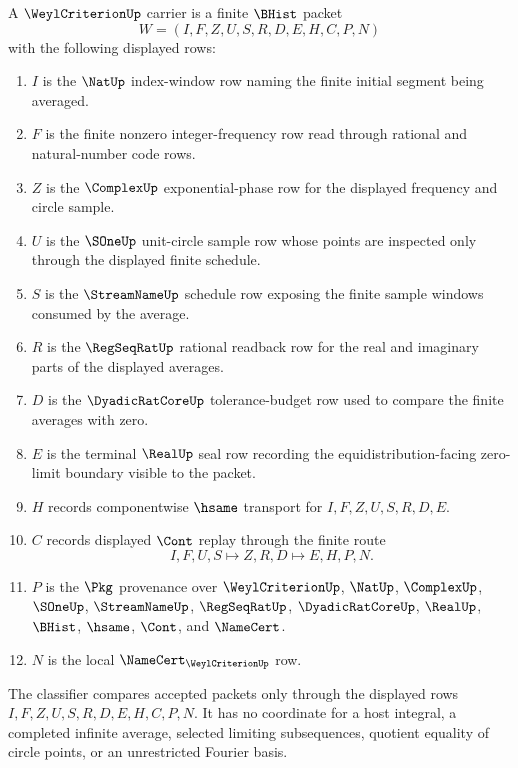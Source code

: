 \begin{definition}
\label{def:weyl-criterion-carrier}
A $\WeylCriterionUp$ carrier is a finite $\BHist$ packet
$$
W=(I,F,Z,U,S,R,D,E,H,C,P,N)
$$
with the following displayed rows:
\begin{enumerate}
\item $I$ is the $\NatUp$ index-window row naming the finite initial segment being averaged.
\item $F$ is the finite nonzero integer-frequency row read through rational and natural-number code rows.
\item $Z$ is the $\ComplexUp$ exponential-phase row for the displayed frequency and circle sample.
\item $U$ is the $\SOneUp$ unit-circle sample row whose points are inspected only through the displayed finite schedule.
\item $S$ is the $\StreamNameUp$ schedule row exposing the finite sample windows consumed by the average.
\item $R$ is the $\RegSeqRatUp$ rational readback row for the real and imaginary parts of the displayed averages.
\item $D$ is the $\DyadicRatCoreUp$ tolerance-budget row used to compare the finite averages with zero.
\item $E$ is the terminal $\RealUp$ seal row recording the equidistribution-facing zero-limit boundary visible to the packet.
\item $H$ records componentwise $\hsame$ transport for $I,F,Z,U,S,R,D,E$.
\item $C$ records displayed $\Cont$ replay through the finite route
$$
I,F,U,S \longmapsto Z,R,D \longmapsto E,H,P,N .
$$
\item $P$ is the $\Pkg$ provenance over $\WeylCriterionUp$, $\NatUp$, $\ComplexUp$, $\SOneUp$, $\StreamNameUp$, $\RegSeqRatUp$, $\DyadicRatCoreUp$, $\RealUp$, $\BHist$, $\hsame$, $\Cont$, and $\NameCert$.
\item $N$ is the local $\NameCert_{\WeylCriterionUp}$ row.
\end{enumerate}
The classifier compares accepted packets only through the displayed rows $I,F,Z,U,S,R,D,E,H,C,P,N$. It has no coordinate for a host integral, a completed infinite average, selected limiting subsequences, quotient equality of circle points, or an unrestricted Fourier basis.
\end{definition}

